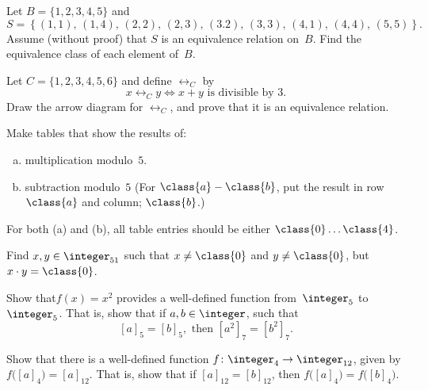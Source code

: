 \begin{exercise}\label{exercise:TestPractice:EquivClassEasyEx}
Let $B = \{1,2,3,4,5\}$ and 
	$$S = \left\{ (1,1),\, (1,4),\, (2,2),\, (2,3),\, (3.2),\, 
		(3,3),\, (4,1),\, (4,4),\, (5,5)
		 \right\} .$$
Assume (without proof) that $S$ is an equivalence relation on~$B$. Find the equivalence class of each element of~$B$.
\end{exercise}

\begin{exercise}
Let $C = \{1,2,3,4,5,6\}$ and define $\rel_C$ by 
\[ x \rel_C y \iff x + y \text{ is divisible by 3.} \]
Draw the arrow diagram for $\rel_C$, and prove that it is an equivalence relation.
\end{exercise}

\begin{exercise}\label{exercise:TestPractice:Mod3TablesEx}
Make tables that show the results of:
\begin{enumerate}[(a)]
\item \label{Mod3TablesEx-multiplication}
multiplication modulo~$5$.
\item \label{Mod3TablesEx-subtraction}
subtraction modulo~$5$ (For $\class{a} - \class{b}$,  put the result in row $\class{a}$ and column; $\class{b}$.)
\end{enumerate}
For both (a) and (b), all table entries should be  either $\class{0} \ldots \class{4}$.
\end{exercise}

\begin{exercise}\label{exercise:TestPractice:ModArithEx2}  
Find $x,y \in \integer_{51}$ such that $x \neq \class{0}$ and $y \neq \class{0}$, but $x \cdot y = \class{0}$.
\end{exercise}

\begin{exercise}\label{exercise:TestPractice:WellDefEx}
 Show that$f(x)=x^2$ provides a well-defined function from~$\integer_5$ to~$\integer_5$. That is, show that if $a,b \in \integer$, such that 
\[ [a]_5 = [b]_5, \text{ then } [ a^2]_7 = [ b^2]_7.\]
\end{exercise}

\begin{exercise}\label{exercise:TestPractice:57}
Show that there is a well-defined function 
$f \colon \integer_4 \to \integer_{12}$, given by \\
$ f \bigl( [a]_4 \bigr) = [a]_{12}$. 
That is, show that if $[a]_{12} = [b]_{12}$, then $f \bigl( [a]_4 \bigr) = f \bigl( [b]_4 \bigr)$.
\end{exercise}

